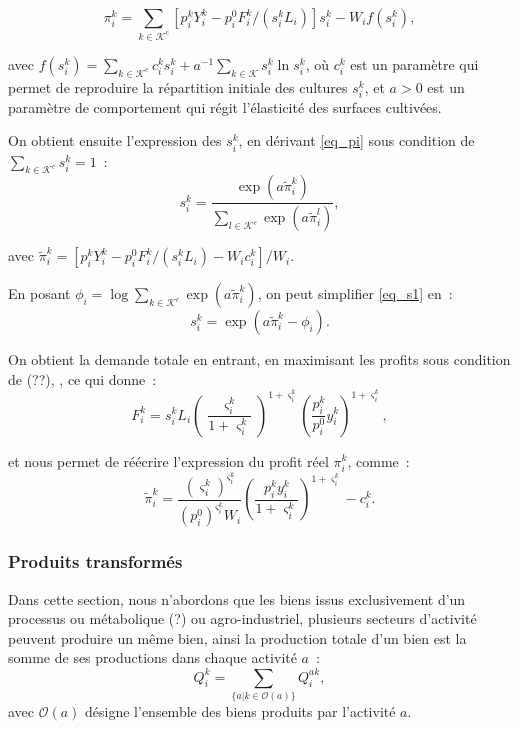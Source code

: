 \begin{equation}
	\pi_i^k = \sum_{k \in \mathcal{K}^c} [p_i^k Y_i^k - p_i^0 F_i^k/(s_i^k L_i)]s_i^k - W_i f(s_i^k),
\end{equation}

avec $f(s_i^k) = \sum_{k \in \mathcal{K}^c} c_i^k s_i^k + a^{-1} \sum_{k \in \mathcal{K}} s_i^k \ln s_i^k$, où $c_i^k$ est un paramètre qui permet de reproduire la répartition initiale des cultures $s_i^k$, et $a > 0$ est un paramètre de comportement qui régit l’élasticité des surfaces cultivées.

On obtient ensuite l’expression des $s_i^k$, en dérivant \ref{eq_pi} sous condition de $\sum_{k\in \mathcal{K}^c} s_i^k = 1$~:
\begin{equation}\label{eq_s1}
	s_i^k = \frac{\exp(a \tilde{\pi}_i^k)}{\sum_{l \in \mathcal{K}^c} \exp(a \tilde{\pi}_i^l)},
\end{equation}

avec $\tilde{\pi}_i^k = [p_i^k Y_i^k - p_i^0 F_i^k/(s_i^k L_i) - W_i c_i^k]/W_i$.

En posant $\phi_i = \log \sum_{k \in \mathcal{K}^c} \exp(a \tilde{\pi}_i^k)$, on peut simplifier \ref{eq_s1} en~:
\begin{equation}
	s_i^k = \exp(a \tilde{\pi}_i^k - \phi_i).
\end{equation}

On obtient la demande totale en entrant, en maximisant les profits sous condition de (??), , ce qui donne~:
\begin{equation}
	F_i^k = s_i^k L_i \left( \frac{\varsigma_i^k}{1+\varsigma_i^k} \right)^{1+\varsigma_i^k} \left( \frac{p_i^k}{p_i^0} y_i^k \right)^{1+\varsigma_i^k},
\end{equation}

et nous permet de réécrire l’expression du profit réel $\pi_i^k$, comme~:
\begin{equation}
	\tilde{\pi}_i^k = \frac{\left( \varsigma_i^k \right)^{\varsigma_i^k}}{\left(  p_i^0 \right)^{\varsigma_i^k}W_i} \left( \frac{p_i^k y_i^k}{1+\varsigma_i^k }\right)^{1+\varsigma_i^k}-c_i^k.
\end{equation}


\subsubsection{Produits transformés}
Dans cette section, nous n’abordons que les biens issus exclusivement d’un processus ou métabolique (?) ou agro-industriel, plusieurs secteurs d’activité peuvent produire un même bien, ainsi la production totale d’un bien est la somme de ses productions dans chaque activité $a$~:
\begin{equation}
	Q_i^k = \sum_{\{a|k\in \mathcal{O}(a)\}} Q_i^{ak},
\end{equation}
avec $\mathcal{O}(a)$ désigne l’ensemble des biens produits par l’activité $a$.

